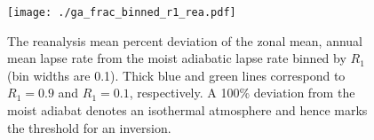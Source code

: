\documentclass{ametsocV5}
\begin{document}
%

%

\begin{figure}
  \noindent\texttt{[image: ./ga\_frac\_binned\_r1\_rea.pdf]}\\
  \caption{The reanalysis mean percent deviation of the zonal mean, annual mean lapse rate from the moist adiabatic lapse rate binned by $R_{1}$ (bin widths are 0.1). Thick blue and green lines correspond to $R_1=0.9$ and $R_1=0.1$, respectively. A 100\% deviation from the moist adiabat denotes an isothermal atmosphere and hence marks the threshold for an inversion.}
  \label{fig:rea-binned-r1}
\end{figure}
\end{document}
